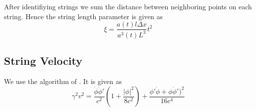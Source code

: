 \documentclass[a4paper]{article}
\begin{document}
After identifiying strings we sum the distance between neighboring points on each string. Hence the string length parameter is given as 
\begin{equation}
	\xi = \frac{a(t) l \Delta x}{a^3(t) L^3} t^2
\end{equation}

\subsection{String Velocity}
We use the algorithm of \cite[appendix A.2, eq. A.10]{axion_dark_matter_strings_and_their_cores}.
It is given as
\begin{equation}
	\gamma^2 v^2 = \frac{\dot{\phi} \dot{\phi}'}{c^2} \left(1 + \frac{|\phi|^2}{8 c^2} \right) + \frac{\phi' \dot{\phi} + \phi \dot{\phi}')^2}{16 c^4}
\end{equation}

\newpage
\printbibliography
\end{document}

